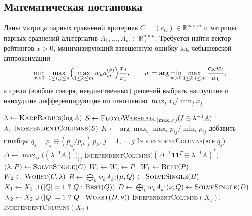 
\subsection*{Математическая постановка}
Даны матрица парных сравнений критериев $C=(c_{kl})\in\mathbb{R}_+^{m\times m}$ и матрицы
парных сравнений альтернатив $A_1,\dots,A_m\in\mathbb{R}_+^{n\times n}$. Требуется найти вектор
рейтингов $x>0$, минимизирующий взвешенную ошибку log-чебышевской аппроксимации
\[
  \min_{x>0}\ \max_{1\le i,j\le n}\Bigl(\max_{1\le k\le m} w_k a^{(k)}_{ij}\Bigr)\frac{x_j}{x_i},
  \qquad
  w=\arg\min_{w>0}\max_{1\le k,l\le m}\frac{c_{kl}w_l}{w_k},
\]
а среди (вообще говоря, неединственных) решений выбрать наилучшие и наихудшие
дифференцирующие по отношению $\max_i x_i/\min_j x_j$ \cite{krivulin2020kio}.

\begin{algorithm}[ht]
\caption{Минимаксная log-чебышевская аппроксимация (библиотека \texttt{tlc})}
\label{alg:tlc}
\begin{algorithmic}[1]
  \State $\lambda \gets \textsc{KarpRadius}(\log A)$ 
  \State $S \gets \textsc{FloydWarshall}_{(\max,\times)}(I \oplus \lambda^{-1}A)$ 
  \State \Return $\lambda,\ \textsc{IndependentColumns}(S)$
\EndFunction
{} 
  \State $K\gets\arg\max_j \max_i p_{ij}/\min_i p_{ij}$
     \State добавить столбцы $q_j = p_j \oplus (p_{lj}/p_{lk})\,p_k$, $j=1,\dots,g$
  \EndFor
  \State \Return \textsc{IndependentColumns}(все $q_j$)
\EndFunction
{} 
  \State $\Delta \gets \max_{ij}\bigl((\lambda^{-1}A)^*\bigr)_{ij}$
  \State \Return \textsc{IndependentColumns}$\bigl((\Delta^{-1}\mathbf{1}\mathbf{1}^T\oplus\lambda^{-1}A)^*\bigr)$
\EndFunction
\State $(\lambda,P)\gets\textsc{SolveSingle}(C)$
 $W_1\gets W_2\gets P$ \Else\ $W_1\gets\textsc{Best}(P)$, $W_2\gets\textsc{Worst}(C,\lambda)$ \EndIf
{}
  \State $B\gets\bigoplus_k w_kA_k$;\quad $(\mu,Q)\gets\textsc{SolveSingle}(B)$
  \State $X_1 \gets X_1 \cup (|Q|=1\ ?\ Q : \textsc{Best}(Q))$
\EndFor
{}
  \State $D\gets\bigoplus_k w_kA_k$;\quad $(\nu,Q)\gets\textsc{SolveSingle}(D)$
  \State $X_2 \gets X_2 \cup (|Q|=1\ ?\ Q : \textsc{Worst}(D,\nu))$
\EndFor
\State \Return \textsc{IndependentColumns}$(X_1)$, \textsc{IndependentColumns}$(X_2)$
\end{algorithmic}
\end{algorithm}

